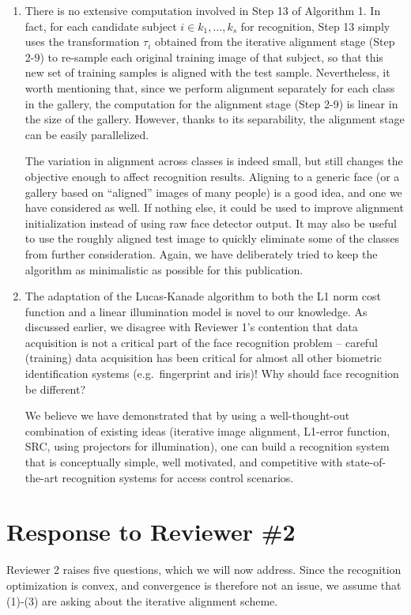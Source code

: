 \documentclass[11pt]{article}
\begin{document}
\begin{enumerate}
\item  There is no extensive computation involved in
    Step 13 of Algorithm 1. In fact, for each candidate
    subject $i\in {k_1, \ldots, k_s}$ for recognition, Step
    13 simply uses the transformation $\tau_i$ obtained
    from the iterative alignment stage (Step 2-9) to
    re-sample each original training
    image of that subject, so that this new set of training
    samples is aligned with the test sample. Nevertheless,
    it worth mentioning that, since we perform alignment
    separately for each class in the gallery, the
    computation for the alignment stage (Step 2-9) is
    linear in the size of the gallery. However, thanks to
    its separability, the alignment stage can be easily
    parallelized.

    The variation in alignment across classes is indeed
    small, but still changes the objective enough to affect
    recognition results. Aligning to a generic face (or a
    gallery based on ``aligned'' images of many people) is
    a good idea, and one we have considered as well.  If
    nothing else, it could be used to improve alignment
    initialization instead of using raw face detector
    output.  It may also be useful to use the roughly
    aligned test image to quickly eliminate some of the
    classes from further consideration.  Again, we have
    deliberately tried to keep the algorithm as minimalistic
    as possible for this publication.

\item The adaptation of the Lucas-Kanade algorithm to both the L1 norm cost
function and a linear illumination model is novel to our knowledge.  As
discussed earlier, we disagree with Reviewer 1's contention that data
acquisition is not a critical part of the face recognition problem -- careful (training)
data acquisition has been critical for almost all other biometric identification
systems (e.g.\ fingerprint and iris)! Why should face recognition be different?

We believe we have demonstrated that by using a well-thought-out combination of existing ideas
(iterative image alignment, L1-error function, SRC, using projectors for
illumination), one can build a recognition system that is conceptually simple, well
motivated, and competitive with state-of-the-art recognition systems for access
control scenarios.

\end{enumerate}

\section{Response to Reviewer \#2}
Reviewer 2 raises five questions, which we will now address.  Since the
recognition optimization is convex, and convergence is therefore not an issue, we assume
that (1)-(3) are asking about the iterative alignment scheme.
\end{document}
